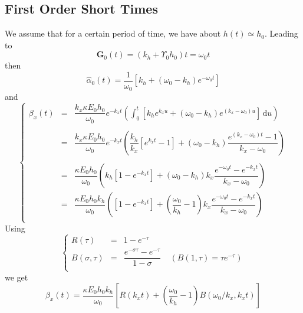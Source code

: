 \documentclass[aps,onecolumn,12pt]{revtex4}
\newcommand{\ig}{\ensuremath{\mathbf{G}}}
\begin{document}
\subsection{First Order Short Times}
We assume that for a certain period of time, we have about $h(t)\simeq h_0$.
Leading to
\begin{equation}
	\ig_0(t) = (k_h+\Upsilon_0h_0) t = \omega_0 t
\end{equation}
then
\begin{equation}
\hat\alpha_0(t) = \dfrac{1}{\omega_0}\left[ k_h + \left(\omega_0 - k_h\right) e^{-\omega_0t}\right]
\end{equation}
and
\begin{equation}
\left\lbrace
\begin{array}{rcl}
\beta_x(t) & = & \displaystyle
\dfrac{k_x \kappa E_0 h_0}{\omega_0}  e^{-k_xt}  \left(
\int_0^t \left[ k_h e^{k_xu} + \left(\omega_0-k_h\right) e^{\left(k_x-\omega_0\right)u}\right] \, \mathrm{d} u\right) \\
\\
 & = & 
 \displaystyle
\dfrac{k_x \kappa E_0 h_0}{\omega_0}  e^{-k_xt}  \left(
\dfrac{k_h}{k_x} \left[ e^{k_xt} -1 \right] + \left(\omega_0-k_h\right) \dfrac{ e^{\left(k_x-\omega_0\right)t}-1}{k_x-\omega_0}
\right)
 \\
 \\
  & = & \dfrac{\kappa E_0 h_0}{\omega_0} 
  \left( 
  k_h \left[1-e^{-k_xt}\right] 
  + \left(\omega_0-k_h\right) k_x \dfrac{e^{-\omega_0t} - e^{-k_xt}}{k_x-\omega_0}
  \right) \\
  & = & 
 \dfrac{\kappa E_0 h_0 k_h}{\omega_0} 
  \left( 
   \left[1-e^{-k_xt}\right] 
  + \left(\dfrac{\omega_0}{k_h}-1\right) k_x \dfrac{e^{-\omega_0t} - e^{-k_xt}}{k_x-\omega_0}
  \right) \\\end{array}
\right.
\end{equation}
Using
\begin{equation}
\left\lbrace
\begin{array}{rcl}
	R(\tau) & = &1-e^{-\tau} \\
	 B(\sigma,\tau) & = & \dfrac{e^{-\sigma\tau}-e^{-\tau}}{1-\sigma} \;\;\;\; (B(1,\tau)=\tau e^{-\tau})\\
\end{array}
\right.
\end{equation}
we get
\begin{equation}
	\beta_x(t) =  \dfrac{\kappa E_0 h_0 k_h}{\omega_0} \left[
	R(k_xt) + \left( \dfrac{\omega_0}{k_h} - 1 \right) B(\omega_0/k_x,k_xt)
	\right]
\end{equation}
\end{document}
